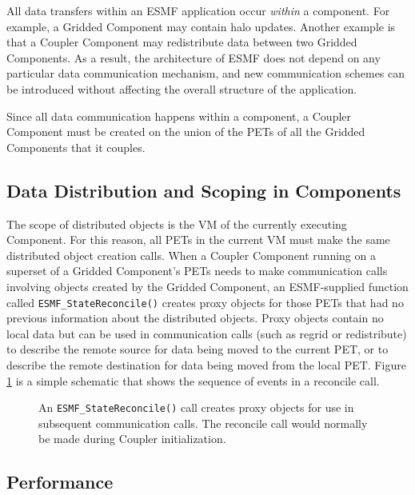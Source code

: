 All data transfers within an ESMF application occur {\it within} a
component.  For example, a Gridded Component may contain halo updates.
Another example is that a Coupler Component may redistribute
data between two Gridded Components.  As a result,
the architecture of ESMF does not depend on any particular data
communication mechanism, and new communication schemes can be
introduced without affecting the overall structure of the application.

Since all data communication happens within a component, a Coupler
Component must be created on the union of the PETs of all
the Gridded Components that it couples.  

\subsection{Data Distribution and Scoping in Components}
\label{sec:scoping}

The scope of distributed objects is the VM of the currently 
executing Component.  For this reason, all
PETs in the current VM must make the same distributed object
creation calls.   When a Coupler Component running on a superset
of a Gridded Component's PETs needs to make communication calls
involving objects created by the Gridded Component,
an ESMF-supplied function called {\tt ESMF\_StateReconcile()} creates proxy
objects for those PETs that had no previous information about the
distributed objects.  Proxy objects contain no local data but
can be used in communication calls (such as regrid or redistribute)
to describe the remote source for data being moved to the current PET,
or to describe the remote destination for data being moved from the local PET.
Figure \ref{fig:reconcile} is a simple schematic that shows the 
sequence of events in a reconcile call.

\begin{center}
\begin{figure}
\caption{An {\tt ESMF\_StateReconcile()} call creates proxy 
objects for use in subsequent communication calls.  The reconcile 
call would normally be made during Coupler initialization.}
\label{fig:reconcile}
\end{figure}
\end{center}

\subsection{Performance}
\label{sec:performance}

